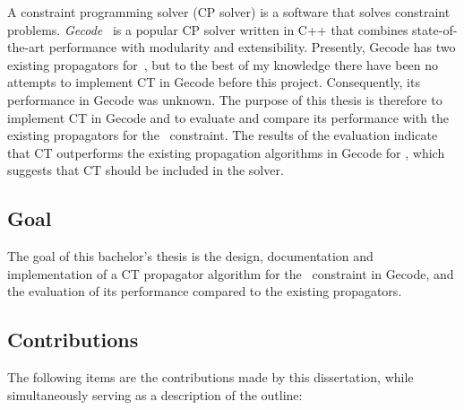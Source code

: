\documentclass[a4paper,11pt]{article}
\newcommand{\Table}{\Constraint{Table}}
\newcommand{\CTpaper}[0]{DBLP:conf/cp/DemeulenaereHLP16}
\numberwithin{equation}{section}
\begin{document}
A constraint programming solver (CP solver) is a software that solves constraint problems.
\emph{Gecode}~\cite{Gecode} is a popular CP solver written in C++ that combines
state-of-the-art performance with modularity and extensibility.
Presently, Gecode has two existing propagators for~\Table,
but to the best of my knowledge there have been no attempts to implement
CT in Gecode before this project.
Consequently, its performance in Gecode was unknown. 
The purpose of this thesis is therefore to implement CT in Gecode and to evaluate
and compare its performance with the existing propagators for
the \Table~constraint.
The results of the evaluation indicate that CT outperforms
the existing propagation algorithms in Gecode for \Table,
which suggests that CT should be included in the solver.


\subsection{Goal}
\label{intro:goal}
The goal of this bachelor's thesis is the design, documentation and implementation
of a CT propagator algorithm for the \Table~constraint in Gecode,
and the evaluation of its performance compared to the existing propagators.

\subsection{Contributions}
\label{intro:contributions}

The following items are the contributions made by this dissertation,
while simultaneously serving as a description of the outline:
\end{document}
